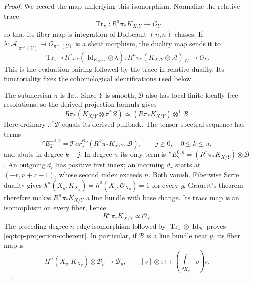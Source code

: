 \documentclass[11pt,reqno]{amsart}
\numberwithin{equation}{section}
\theoremstyle{definition}
\theoremstyle{remark}
\newcommand{\Id}{\operatorname{Id}}
\begin{document}
\begin{proof}
We record the map underlying this isomorphism.  Normalize the relative
trace
\[
 \operatorname{Tr}_\pi:R^n\pi_*K_{X/Y}\longrightarrow\mathcal O_Y
\]
so that its fiber map is integration of Dolbeault $(n,n)$-classes.  If
$\lambda:\mathcal A|_{\pi^{-1}(U)}\to\mathcal O_{\pi^{-1}(U)}$
is a sheaf morphism, the duality map sends it to
\begin{equation}\label{eq:top-duality-trace-map}
 \operatorname{Tr}_\pi\circ
 R^n\pi_*(\Id_{K_{X/Y}}\otimes\lambda):
 R^n\pi_*(K_{X/Y}\otimes\mathcal A)|_U\longrightarrow\mathcal O_U.
\end{equation}
This is the evaluation pairing followed by the trace in relative
duality.  Its functoriality fixes the cohomological identifications
used below.

The submersion $\pi$ is flat. Since $Y$ is smooth, $\mathcal B$ also has
local finite locally free resolutions, so the derived projection formula gives
\[
 R\pi_*(K_{X/Y}\otimes\pi^*\mathcal B)
 \simeq (R\pi_*K_{X/Y})\otimes^{\mathbf L}\mathcal B.
\]
Here ordinary $\pi^*\mathcal B$ equals its derived pullback. The tensor
spectral sequence has terms
\[
 {}''E_2^{-j,k}
 =\mathcal Tor_j^{\mathcal O_Y}(R^k\pi_*K_{X/Y},\mathcal B),
 \qquad j\geq0,\quad 0\leq k\leq n,
\]
and abuts in degree $k-j$. In degree $n$ its only term is
${}''E_2^{0,n}=(R^n\pi_*K_{X/Y})\otimes\mathcal B$.
An outgoing $d_r$ has positive first index; an incoming $d_r$ starts at
$(-r,n+r-1)$, whose second index exceeds $n$. Both vanish.
Fiberwise Serre duality gives
$h^n(X_y,K_{X_y})=h^0(X_y,\mathcal O_{X_y})=1$ for every $y$.
Grauert's theorem therefore makes $R^n\pi_*K_{X/Y}$ a line bundle
with base change. Its trace map is an isomorphism on every fiber, hence
\[
 R^n\pi_*K_{X/Y}\simeq\mathcal O_Y.
\]
The preceding degree-$n$ edge isomorphism followed by
$\operatorname{Tr}_\pi\otimes\Id_{\mathcal B}$ proves
\eqref{eq:top-projection-coherent}.  In particular, if $\mathcal B$
is a line bundle near $y$, its fiber map is
\[
 H^n(X_y,K_{X_y})\otimes\mathcal B_y\longrightarrow\mathcal B_y,
 \qquad [v]\otimes e\longmapsto
       \left(\int_{X_y}v\right)e.
\]
\end{proof}
\end{document}
